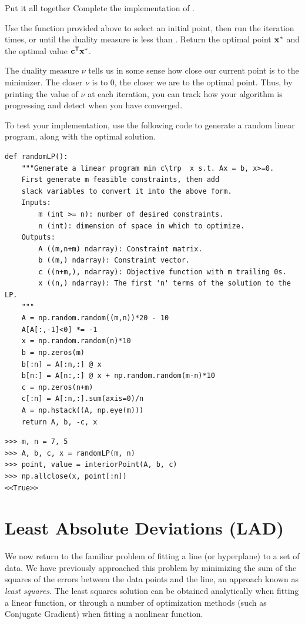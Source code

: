 \begin{problem}{Put it all together}{}%
Complete the implementation of .

Use the function  provided above to select an initial point, then run the iteration  times, or until the duality measure is less than .
Return the optimal point $\mathbf{x}^*$ and the optimal value $\mathbf{c}^{\mathsf T} \mathbf{x}^*$.

The duality measure $\nu$ tells us in some sense how close our current point is to the minimizer.
The closer $\nu$ is to 0, the closer we are to the optimal point.
Thus, by printing the value of $\nu$ at each iteration, you can track how your algorithm is progressing and detect when you have converged.

To test your implementation, use the following code to generate a random linear program, along with the optimal solution.

\begin{lstlisting}
def randomLP():
    """Generate a linear program min c\trp  x s.t. Ax = b, x>=0.
    First generate m feasible constraints, then add
    slack variables to convert it into the above form.
    Inputs:
        m (int >= n): number of desired constraints.
        n (int): dimension of space in which to optimize.
    Outputs:
        A ((m,n+m) ndarray): Constraint matrix.
        b ((m,) ndarray): Constraint vector.
        c ((n+m,), ndarray): Objective function with m trailing 0s.
        x ((n,) ndarray): The first 'n' terms of the solution to the LP.
    """
    A = np.random.random((m,n))*20 - 10
    A[A[:,-1]<0] *= -1
    x = np.random.random(n)*10
    b = np.zeros(m)
    b[:n] = A[:n,:] @ x
    b[n:] = A[n:,:] @ x + np.random.random(m-n)*10
    c = np.zeros(n+m)
    c[:n] = A[:n,:].sum(axis=0)/n
    A = np.hstack((A, np.eye(m)))
    return A, b, -c, x
\end{lstlisting}
\begin{lstlisting}
>>> m, n = 7, 5
>>> A, b, c, x = randomLP(m, n)
>>> point, value = interiorPoint(A, b, c)
>>> np.allclose(x, point[:n])
<<True>>
\end{lstlisting}
\end{problem}


\section*{Least Absolute Deviations (LAD)} %
We now return to the familiar problem of fitting a line (or hyperplane) to a set of data.
We have previously approached this problem by minimizing the sum of the squares of the errors between the data points and the line, an approach known as \emph{least squares}.
The least squares solution can be obtained analytically when fitting a linear function, or through a number of optimization methods (such as Conjugate Gradient) when fitting a nonlinear function.

